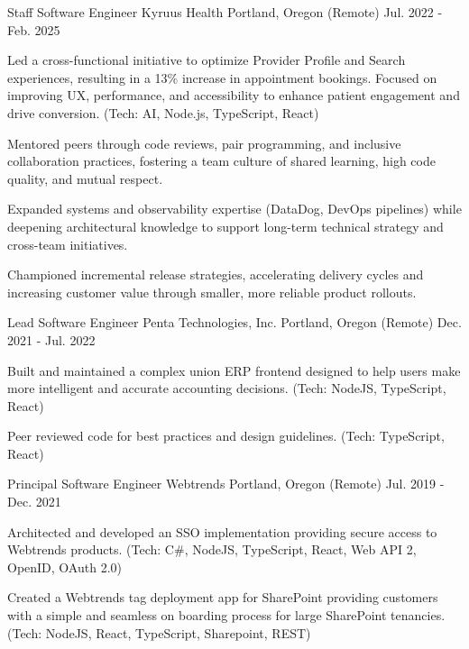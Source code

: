 \begin{cventries}
  \cventry
    {Staff Software Engineer} %
    {Kyruus Health} %
    {Portland, Oregon (Remote)} %
    {Jul. 2022 - Feb. 2025} %
    {
      \begin{cvitems} %
        \item {Led a cross-functional initiative to optimize Provider Profile and Search experiences, resulting in a 13\% increase in appointment bookings. Focused on improving UX, performance, and accessibility to enhance patient engagement and drive conversion. (Tech: AI, Node.js, TypeScript, React)}
        \item {Mentored peers through code reviews, pair programming, and inclusive collaboration practices, fostering a team culture of shared learning, high code quality, and mutual respect.}
        \item {Expanded systems and observability expertise (DataDog, DevOps pipelines) while deepening architectural knowledge to support long-term technical strategy and cross-team initiatives.}
        \item {Championed incremental release strategies, accelerating delivery cycles and increasing customer value through smaller, more reliable product rollouts.}
      \end{cvitems}
    }

  \cventry
    {Lead Software Engineer} %
    {Penta Technologies, Inc.} %
    {Portland, Oregon (Remote)} %
    {Dec. 2021 - Jul. 2022} %
    {
      \begin{cvitems} %
        \item {Built and maintained a complex union ERP frontend designed to help users make more intelligent and accurate accounting decisions. (Tech: NodeJS, TypeScript, React)}
        \item {Peer reviewed code for best practices and design guidelines. (Tech: TypeScript, React)}
      \end{cvitems}
    }

  \cventry
    {Principal Software Engineer} %
    {Webtrends} %
    {Portland, Oregon (Remote)} %
    {Jul. 2019 - Dec. 2021} %
    {
      \begin{cvitems} %
        \item {Architected and developed an SSO implementation providing secure access to Webtrends products. (Tech: C\#, NodeJS, TypeScript, React, Web API 2, OpenID, OAuth 2.0)}
        \item {Created a Webtrends tag deployment app for SharePoint providing customers with a simple and seamless on boarding process for large SharePoint tenancies. (Tech: NodeJS, React, TypeScript, Sharepoint, REST)}
      \end{cvitems}
    }


\end{cventries}
